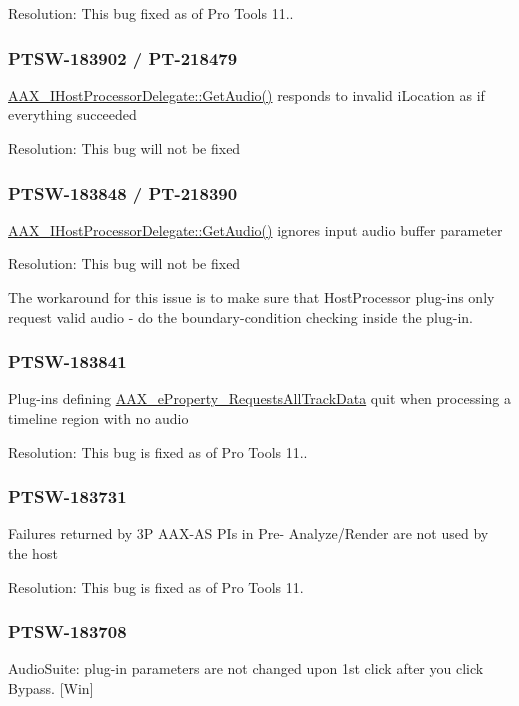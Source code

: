Resolution\+: This bug fixed as of Pro Tools 11..\hypertarget{a00374_PTSW-183902}{}\subsubsection{P\+T\+S\+W-\/183902 / P\+T-\/218479}\label{a00374_PTSW-183902}
\hyperlink{a00102_aa7d5eb30282956a40ed34acc5881298c}{A\+A\+X\+\_\+\+I\+Host\+Processor\+Delegate\+::\+Get\+Audio()} responds to invalid i\+Location as if everything succeeded

Resolution\+: This bug will not be fixed\hypertarget{a00374_PTSW-183848}{}\subsubsection{P\+T\+S\+W-\/183848 / P\+T-\/218390}\label{a00374_PTSW-183848}
\hyperlink{a00102_aa7d5eb30282956a40ed34acc5881298c}{A\+A\+X\+\_\+\+I\+Host\+Processor\+Delegate\+::\+Get\+Audio()} ignores input audio buffer parameter

Resolution\+: This bug will not be fixed

The workaround for this issue is to make sure that Host\+Processor plug-\/ins only request valid audio -\/ do the boundary-\/condition checking inside the plug-\/in.\hypertarget{a00374_PTSW-183841}{}\subsubsection{P\+T\+S\+W-\/183841}\label{a00374_PTSW-183841}
Plug-\/ins defining \hyperlink{a00283_a6571f4e41a5dd06e4067249228e2249eaa59caaf3d7c3e195a32b8cb09a9baac2}{A\+A\+X\+\_\+e\+Property\+\_\+\+Requests\+All\+Track\+Data} quit when processing a timeline region with no audio

Resolution\+: This bug is fixed as of Pro Tools 11..\hypertarget{a00374_PTSW-183731}{}\subsubsection{P\+T\+S\+W-\/183731}\label{a00374_PTSW-183731}
Failures returned by 3\+P A\+A\+X-\/\+A\+S P\+Is in Pre-\/ Analyze/\+Render are not used by the host

Resolution\+: This bug is fixed as of Pro Tools 11.\hypertarget{a00374_PTSW-183708}{}\subsubsection{P\+T\+S\+W-\/183708}\label{a00374_PTSW-183708}
Audio\+Suite\+: plug-\/in parameters are not changed upon 1st click after you click Bypass. \mbox{[}Win\mbox{]}

